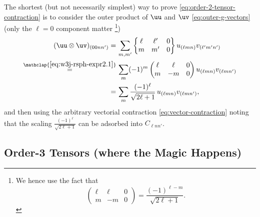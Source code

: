 The shortest (but not necessarily simplest) way to prove \eqref{eq:order-2-tensor-contraction} is to consider the outer product of $\uu$ and $\uv$ \eqref{eq:outer-g-vectors} (only the $\ell=0$ component matter%
\footnote{
We hence use the fact that \citep{varshalovich_quantum_1988}
\begin{equation}
    \begin{pmatrix}
        \ell & \ell & 0 \\
	    m & -m & 0
    \end{pmatrix}
    =
    \frac{(-1)^{\ell - m}}{\sqrt{2\ell + 1}}.
\end{equation}
})
\begin{align}
    (\uu \otimes \uv)_{(00nn')}
    =\,&
    \sum_{m,m'}
    \begin{Bmatrix}
        \ell & \ell' & 0 \\
	    m & m' & 0
    \end{Bmatrix}
    u_{(\ell mn)} v_{(\ell'm'n')} \\
    \overset{\mathclap{\eqref{eq:w3j-rsph-expr2.1}}}{=}\,&
    \sum_{m}
    (-1)^{m}
    \begin{pmatrix}
        \ell & \ell & 0 \\
	    m & -m & 0
    \end{pmatrix}
    u_{(\ell mn)} v_{(\ell mn')} \\
    =\,&
    \sum_{m}
    \frac{(-1)^{\ell}}{\sqrt{2\ell + 1}} \,
    u_{(\ell mn)} v_{(\ell mn')}
    ,
\end{align}
and then using the arbitrary vectorial contraction \eqref{eq:vector-contraction} noting that the scaling $\frac{(-1)^{\ell}}{\sqrt{2\ell + 1}}$ can be adsorbed into $C_{\ell n n'}$.

\subsection{Order-3 Tensors (where the Magic Happens)}

